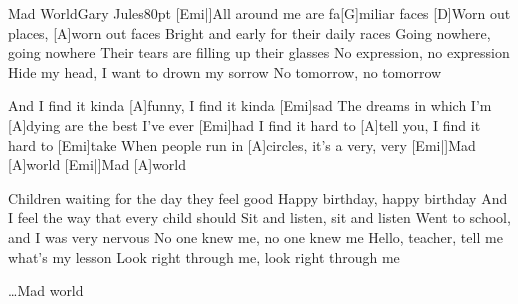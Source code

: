 \begin{song}{Mad World}{Gary Jules}{80pt}
%
[Emi|]{}All around me are fa[G]miliar faces
[D]Worn out places, [A]worn out faces
Bright and early for their daily races
Going nowhere, going nowhere
Their tears are filling up their glasses
No expression, no expression
Hide my head, I want to drown my sorrow
No tomorrow, no tomorrow

\chorus%
[Emi|]{}And I find it kinda [A]funny, I find it kinda [Emi]sad
The dreams in which I'm [A]dying are the best I've ever [Emi]had
I find it hard to [A]tell you, I find it hard to [Emi]take
When people run in [A]circles, it's a very, very
[Emi|]{}Mad [A]world
[Emi|]{}Mad [A]world


%
Children waiting for the day they feel good
Happy birthday, happy birthday
And I feel the way that every child should
Sit and listen, sit and listen
Went to school, and I was very nervous
No one knew me, no one knew me
Hello, teacher, tell me what's my lesson
Look right through me, look right through me

\chorus%
\dots \rl Mad world

\end{song}
